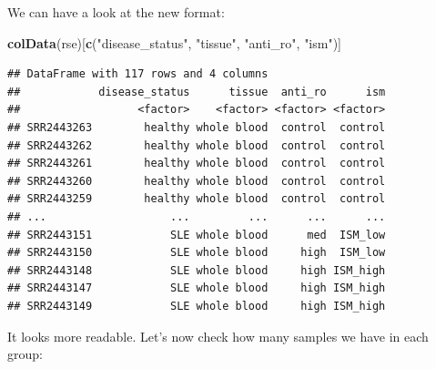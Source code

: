 \documentclass[9pt,a4paper,]{extarticle}
\newenvironment{Shaded}{\begin{snugshade}}{\end{snugshade}}
\newcommand{\KeywordTok}[1]{\textcolor[rgb]{0.13,0.29,0.53}{\textbf{#1}}}
\newcommand{\DecValTok}[1]{\textcolor[rgb]{0.00,0.00,0.81}{#1}}
\newcommand{\StringTok}[1]{\textcolor[rgb]{0.31,0.60,0.02}{#1}}
\newcommand{\CommentTok}[1]{\textcolor[rgb]{0.56,0.35,0.01}{\textit{#1}}}
\newcommand{\OperatorTok}[1]{\textcolor[rgb]{0.81,0.36,0.00}{\textbf{#1}}}
\newcommand{\NormalTok}[1]{#1}
\begin{document}
\begin{Shaded}
\begin{Highlighting}[]
\KeywordTok{colData}\NormalTok{(rse)}\OperatorTok{$}\NormalTok{anti_ro <-}\StringTok{ }\KeywordTok{factor}\NormalTok{(}\KeywordTok{colData}\NormalTok{(rse)}\OperatorTok{$}\NormalTok{anti_ro)}
\CommentTok{# ism}
\KeywordTok{colData}\NormalTok{(rse)}\OperatorTok{$}\NormalTok{ism <-}\StringTok{ }\KeywordTok{sapply}\NormalTok{(}\KeywordTok{colData}\NormalTok{(rse)}\OperatorTok{$}\NormalTok{characteristics, }\StringTok{"["}\NormalTok{, }\DecValTok{4}\NormalTok{)}
\KeywordTok{colData}\NormalTok{(rse)}\OperatorTok{$}\NormalTok{ism <-}\KeywordTok{sub}\NormalTok{(}\StringTok{"ism: "}\NormalTok{, }\StringTok{""}\NormalTok{, }\KeywordTok{colData}\NormalTok{(rse)}\OperatorTok{$}\NormalTok{ism)}
\KeywordTok{colData}\NormalTok{(rse)}\OperatorTok{$}\NormalTok{ism <-}\StringTok{ }\KeywordTok{factor}\NormalTok{(}\KeywordTok{colData}\NormalTok{(rse)}\OperatorTok{$}\NormalTok{ism)}
\end{Highlighting}
\end{Shaded}

We can have a look at the new format:

\begin{Shaded}
\begin{Highlighting}[]
\KeywordTok{colData}\NormalTok{(rse)[}\KeywordTok{c}\NormalTok{(}\StringTok{"disease_status"}\NormalTok{, }\StringTok{"tissue"}\NormalTok{, }\StringTok{"anti_ro"}\NormalTok{, }\StringTok{"ism"}\NormalTok{)]}
\end{Highlighting}
\end{Shaded}

\begin{verbatim}
## DataFrame with 117 rows and 4 columns
##            disease_status      tissue  anti_ro      ism
##                  <factor>    <factor> <factor> <factor>
## SRR2443263        healthy whole blood  control  control
## SRR2443262        healthy whole blood  control  control
## SRR2443261        healthy whole blood  control  control
## SRR2443260        healthy whole blood  control  control
## SRR2443259        healthy whole blood  control  control
## ...                   ...         ...      ...      ...
## SRR2443151            SLE whole blood      med  ISM_low
## SRR2443150            SLE whole blood     high  ISM_low
## SRR2443148            SLE whole blood     high ISM_high
## SRR2443147            SLE whole blood     high ISM_high
## SRR2443149            SLE whole blood     high ISM_high
\end{verbatim}

It looks more readable.
Let's now check how many samples we have in each group:
\end{document}

